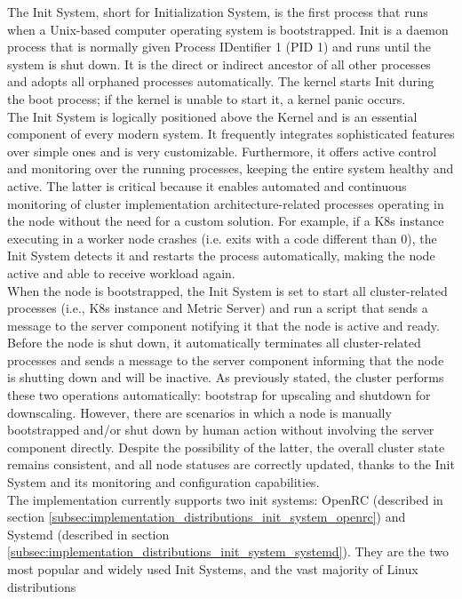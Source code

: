 The Init System, short for Initialization System, is the first process that runs
when a Unix-based computer operating system is bootstrapped. Init is a daemon process
that is normally given Process IDentifier 1 (PID 1) and runs until the system is
shut down. It is the direct or indirect ancestor of all other processes and
adopts all orphaned processes automatically. The kernel starts Init during the boot
process; if the kernel is unable to start it, a kernel panic occurs\cite{init_system}.
\\ %
The Init System is logically positioned above the Kernel and is an essential
component of every modern system. It frequently integrates sophisticated features
over simple ones and is very customizable. Furthermore, it offers active control
and monitoring over the running processes, keeping the entire system healthy and
active. The latter is critical because it enables automated and continuous monitoring
of cluster implementation architecture-related processes operating in the node without
the need for a custom solution. For example, if a K8s instance executing in a worker
node crashes (i.e. exits with a code different than 0), the Init System detects it
and restarts the process automatically, making the node active and able to
receive workload again. \\ %
When the node is bootstrapped, the Init System is set to start all cluster-related
processes (i.e., K8s instance and Metric Server) and run a script that sends a message
to the server component notifying it that the node is active and ready. Before
the node is shut down, it automatically terminates all cluster-related processes
and sends a message to the server component informing that the node is shutting down
and will be inactive. As previously stated, the cluster performs these two operations
automatically: bootstrap for upscaling and shutdown for downscaling. However,
there are scenarios in which a node is manually bootstrapped and/or shut down by
human action without involving the server component directly. Despite the possibility
of the latter, the overall cluster state remains consistent, and all node statuses
are correctly updated, thanks to the Init System and its monitoring and
configuration capabilities. \\ %
The implementation currently supports two init systems: OpenRC (described in
section \ref{subsec:implementation_distributions_init_system_openrc}) and Systemd
(described in section
\ref{subsec:implementation_distributions_init_system_systemd}). They are the two
most popular and widely used Init Systems, and the vast majority of Linux distributions
